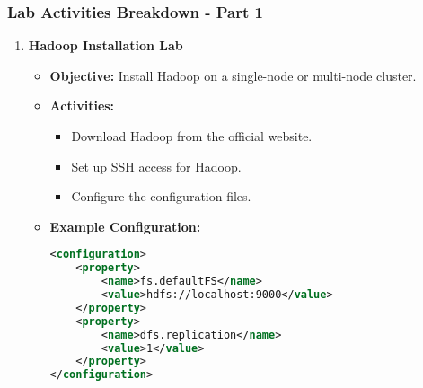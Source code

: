 \documentclass[aspectratio=169]{beamer}
\begin{document}
\begin{frame}[fragile]
    \frametitle{Lab Activities Breakdown - Part 1}
    \begin{enumerate}
        \item \textbf{Hadoop Installation Lab}
        \begin{itemize}
            \item \textbf{Objective:} Install Hadoop on a single-node or multi-node cluster.
            \item \textbf{Activities:}
            \begin{itemize}
                \item Download Hadoop from the official website.
                \item Set up SSH access for Hadoop.
                \item Configure the configuration files.
            \end{itemize}
            \item \textbf{Example Configuration:}
            \begin{lstlisting}[language=XML]
<configuration>
    <property>
        <name>fs.defaultFS</name>
        <value>hdfs://localhost:9000</value>
    </property>
    <property>
        <name>dfs.replication</name>
        <value>1</value>
    </property>
</configuration>
            \end{lstlisting}
        \end{itemize}
    \end{enumerate}
\end{frame}
\end{document}
